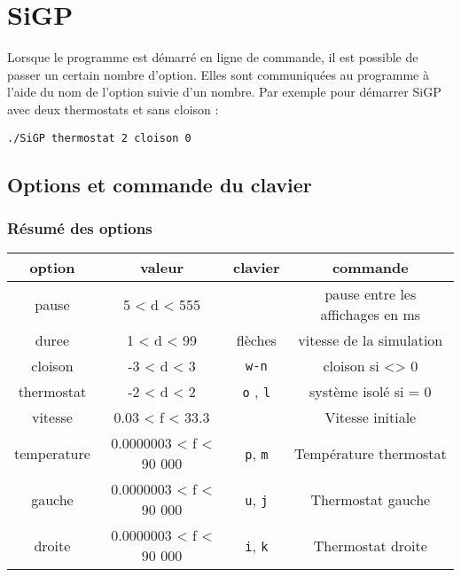 %
\section{SiGP}
%
%
Lorsque le programme est démarré en ligne de commande, il est possible de passer un certain nombre d'option. Elles sont communiquées au programme à l'aide du nom de l'option suivie d'un nombre. Par exemple pour démarrer SiGP avec deux thermostats et sans cloison :
%
\begin{center}
\texttt{./SiGP thermostat 2 cloison 0}
\end{center}
%
\subsection{Options et commande du clavier}
%
\subsubsection{Résumé des options}
\begin{center}
\begin{tabular}{cccc}
option & valeur & clavier & commande \\
\hline
pause & 5 < d < 555 &  & pause entre les affichages en ms \\
duree & 1 < d < 99 & flèches & vitesse de la simulation \\
cloison & -3 < d < 3 & \texttt{w-n} & cloison si <> 0 \\
thermostat & -2 < d < 2 & \texttt{o} , \texttt{l} & système isolé si = 0 \\
vitesse & 0.03 < f < 33.3 &  & Vitesse initiale \\
temperature & 0.0000003 < f < 90 000 & \texttt{p}, \texttt{m} & Température thermostat \\
gauche & 0.0000003 < f < 90 000 & \texttt{u}, \texttt{j} & Thermostat gauche \\
droite & 0.0000003 < f < 90 000 & \texttt{i}, \texttt{k} & Thermostat droite \\
\end{tabular}
\end{center}
%

